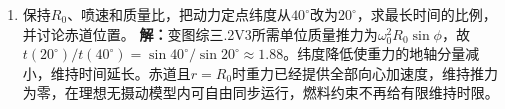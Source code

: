 \documentclass[UTF8,fontset=fandol,a4paper,11pt]{ctexart}
\begin{document}
\begin{enumerate}
\item 保持$R_0$、喷速和质量比，把动力定点纬度从$40^\circ$改为$20^\circ$，求最长时间的比例，并讨论赤道位置。
\textbf{解：}变图综三.2V3所需单位质量推力为$\omega_0^2R_0\sin\phi$，故$t(20^\circ)/t(40^\circ)=\sin40^\circ/\sin20^\circ\approx1.88$。纬度降低使重力的地轴分量减小，维持时间延长。赤道且$r=R_0$时重力已经提供全部向心加速度，维持推力为零，在理想无摄动模型内可自由同步运行，燃料约束不再给有限维持时限。
\begin{center}\begin{minipage}{.98\linewidth}\centering
{}
\end{minipage}
\end{center}
\end{enumerate}
\end{document}
